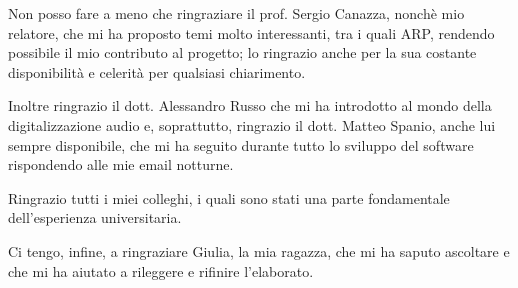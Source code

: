 
Non posso fare a meno che ringraziare il prof. Sergio Canazza, nonchè mio relatore, che mi ha proposto temi molto interessanti, tra i quali \ac{ARP}, rendendo possibile il mio contributo al progetto; lo ringrazio anche per la sua costante disponibilità e celerità per qualsiasi chiarimento.

Inoltre ringrazio il dott. Alessandro Russo che mi ha introdotto al mondo della digitalizzazione audio e, soprattutto, ringrazio il dott. Matteo Spanio, anche lui sempre disponibile, che mi ha seguito durante tutto lo sviluppo del software rispondendo alle mie email notturne.

Ringrazio tutti i miei colleghi, i quali sono stati una parte fondamentale dell'esperienza universitaria.

Ci tengo, infine, a ringraziare Giulia, la mia ragazza, che mi ha saputo ascoltare e che mi ha aiutato a rileggere e rifinire l'elaborato.